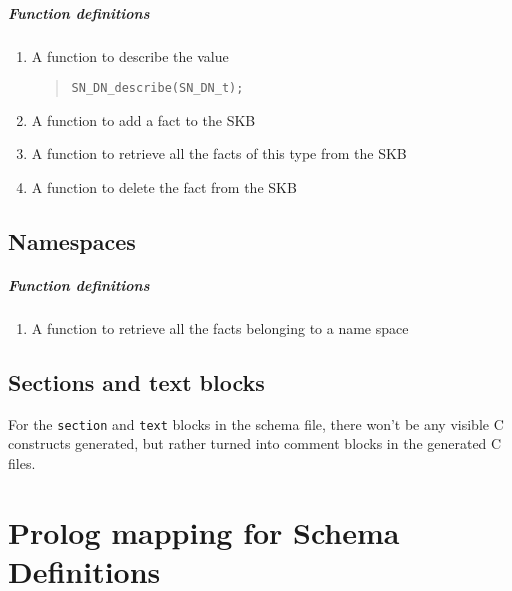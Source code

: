 \documentclass[a4paper,11pt,twoside]{report}
\begin{document}
{{\paragraph{Function definitions}
\begin{enumerate}
  \item A function to describe the value 
        \begin{quote}
          \texttt{SN\_DN\_describe(SN\_DN\_t);}
        \end{quote}
  \item A function to add a fact to the SKB
  \item A function to retrieve all the facts of this type from the SKB
  \item A function to delete the fact from the SKB
\end{enumerate}


\section{Namespaces}

\paragraph{Function definitions}
\begin{enumerate}
    \item A function to retrieve all the facts belonging to a name space
\end{enumerate}


\section{Sections and text blocks}
For the \texttt{section} and \texttt{text} blocks in the schema file, there
won't be any visible C constructs generated, but rather turned into comment
blocks in the generated C files.




\chapter{Prolog mapping for Schema Definitions}
\label{chap:prologmapping}

}}
\end{document}
